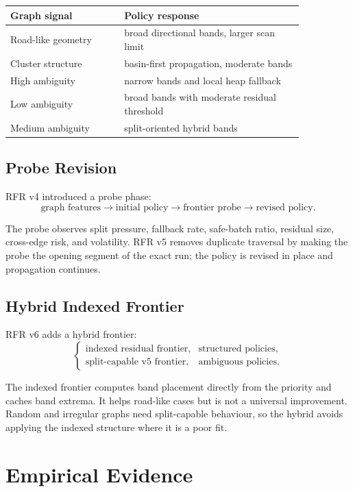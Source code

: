 \documentclass[11pt]{article}
\begin{document}
\begin{center}
\begin{tabular}{p{0.33\linewidth}p{0.52\linewidth}}
\toprule
Graph signal & Policy response \\
\midrule
Road-like geometry & broad directional bands, larger scan limit \\
Cluster structure & basin-first propagation, moderate bands \\
High ambiguity & narrow bands and local heap fallback \\
Low ambiguity & broad bands with moderate residual threshold \\
Medium ambiguity & split-oriented hybrid bands \\
\bottomrule
\end{tabular}
\end{center}

\subsection{Probe Revision}

RFR v4 introduced a probe phase:
\[
  \text{graph features} \rightarrow \text{initial policy}
  \rightarrow \text{frontier probe}
  \rightarrow \text{revised policy}.
\]

The probe observes split pressure, fallback rate, safe-batch ratio, residual size, cross-edge risk, and volatility. RFR v5 removes duplicate traversal by making the probe the opening segment of the exact run; the policy is revised in place and propagation continues.

\subsection{Hybrid Indexed Frontier}

RFR v6 adds a hybrid frontier:
\[
  \begin{cases}
    \text{indexed residual frontier}, & \text{structured policies},\\
    \text{split-capable v5 frontier}, & \text{ambiguous policies}.
  \end{cases}
\]

The indexed frontier computes band placement directly from the priority and caches band extrema. It helps road-like cases but is not a universal improvement. Random and irregular graphs need split-capable behaviour, so the hybrid avoids applying the indexed structure where it is a poor fit.

\section{Empirical Evidence}
\label{sec:empirical}
\end{document}
